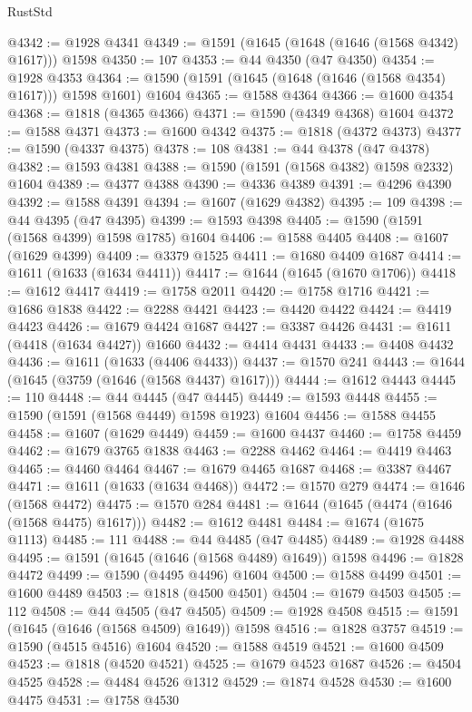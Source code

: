\begin{lexlean}{RustStd}
\begin{coremodule}
@4342 := @1928 @4341
@4349 := @1591 (@1645 (@1648 (@1646 (@1568 @4342) @1617))) @1598
@4350 := 107
@4353 := @44 @4350 (@47 @4350)
@4354 := @1928 @4353
@4364 := @1590 (@1591 (@1645 (@1648 (@1646 (@1568 @4354) @1617))) @1598 @1601) @1604
@4365 := @1588 @4364
@4366 := @1600 @4354
@4368 := @1818 (@4365 @4366)
@4371 := @1590 (@4349 @4368) @1604
@4372 := @1588 @4371
@4373 := @1600 @4342
@4375 := @1818 (@4372 @4373)
@4377 := @1590 (@4337 @4375)
@4378 := 108
@4381 := @44 @4378 (@47 @4378)
@4382 := @1593 @4381
@4388 := @1590 (@1591 (@1568 @4382) @1598 @2332) @1604
@4389 := @4377 @4388
@4390 := @4336 @4389
@4391 := @4296 @4390
@4392 := @1588 @4391
@4394 := @1607 (@1629 @4382)
@4395 := 109
@4398 := @44 @4395 (@47 @4395)
@4399 := @1593 @4398
@4405 := @1590 (@1591 (@1568 @4399) @1598 @1785) @1604
@4406 := @1588 @4405
@4408 := @1607 (@1629 @4399)
@4409 := @3379 @1525
@4411 := @1680 @4409 @1687
@4414 := @1611 (@1633 (@1634 @4411))
@4417 := @1644 (@1645 (@1670 @1706))
@4418 := @1612 @4417
@4419 := @1758 @2011
@4420 := @1758 @1716
@4421 := @1686 @1838
@4422 := @2288 @4421
@4423 := @4420 @4422
@4424 := @4419 @4423
@4426 := @1679 @4424 @1687
@4427 := @3387 @4426
@4431 := @1611 (@4418 (@1634 @4427)) @1660
@4432 := @4414 @4431
@4433 := @4408 @4432
@4436 := @1611 (@1633 (@4406 @4433))
@4437 := @1570 @241
@4443 := @1644 (@1645 (@3759 (@1646 (@1568 @4437) @1617)))
@4444 := @1612 @4443
@4445 := 110
@4448 := @44 @4445 (@47 @4445)
@4449 := @1593 @4448
@4455 := @1590 (@1591 (@1568 @4449) @1598 @1923) @1604
@4456 := @1588 @4455
@4458 := @1607 (@1629 @4449)
@4459 := @1600 @4437
@4460 := @1758 @4459
@4462 := @1679 @3765 @1838
@4463 := @2288 @4462
@4464 := @4419 @4463
@4465 := @4460 @4464
@4467 := @1679 @4465 @1687
@4468 := @3387 @4467
@4471 := @1611 (@1633 (@1634 @4468))
@4472 := @1570 @279
@4474 := @1646 (@1568 @4472)
@4475 := @1570 @284
@4481 := @1644 (@1645 (@4474 (@1646 (@1568 @4475) @1617)))
@4482 := @1612 @4481
@4484 := @1674 (@1675 @1113)
@4485 := 111
@4488 := @44 @4485 (@47 @4485)
@4489 := @1928 @4488
@4495 := @1591 (@1645 (@1646 (@1568 @4489) @1649)) @1598
@4496 := @1828 @4472
@4499 := @1590 (@4495 @4496) @1604
@4500 := @1588 @4499
@4501 := @1600 @4489
@4503 := @1818 (@4500 @4501)
@4504 := @1679 @4503
@4505 := 112
@4508 := @44 @4505 (@47 @4505)
@4509 := @1928 @4508
@4515 := @1591 (@1645 (@1646 (@1568 @4509) @1649)) @1598
@4516 := @1828 @3757
@4519 := @1590 (@4515 @4516) @1604
@4520 := @1588 @4519
@4521 := @1600 @4509
@4523 := @1818 (@4520 @4521)
@4525 := @1679 @4523 @1687
@4526 := @4504 @4525
@4528 := @4484 @4526 @1312
@4529 := @1874 @4528
@4530 := @1600 @4475
@4531 := @1758 @4530

\end{coremodule}
\end{lexlean}
